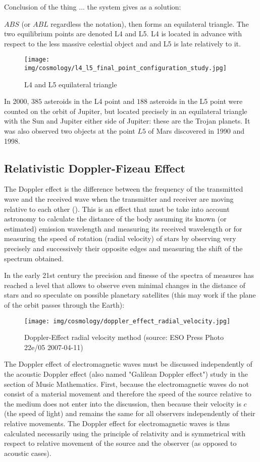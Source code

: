 	Conclusion of the thing ... the system gives as a solution:
	
	$ABS$ (or $ABL$ regardless the notation), then forms an equilateral triangle. The two equilibrium points are denoted L4 and L5. L4 is located in advance with respect to the less massive celestial object and and L5 is late relatively to it.
	\begin{figure}[H]
		\begin{center}
		\texttt{[image: img/cosmology/l4\_l5\_final\_point\_configuration\_study.jpg]}
		\end{center}	
		\caption[]{L4 and L5 equilateral triangle}
	\end{figure}
	In 2000, $385$ asteroids in the L4 point and $188$ asteroids in the L5 point were counted on the orbit of Jupiter, but located precisely in an equilateral triangle with the Sun and Jupiter either side of Jupiter: these are the Trojan planets. It was also observed two objects at the point $L5$ of Mars discovered in 1990 and 1998.
	
	\pagebreak
	\subsection{Relativistic Doppler-Fizeau Effect}
	The Doppler effect is the difference between the frequency of the transmitted wave and the received wave when the transmitter and receiver are moving relative to each other (). This is an effect that must be take into account astronomy to calculate the distance of the body assuming its known (or estimated)  emission wavelength and measuring its received wavelength or for measuring the speed of rotation (radial velocity) of stars by observing very precisely and successively their opposite edges and measuring the shift of the spectrum obtained.

	In the early 21st century the precision and finesse of the spectra of measures has reached a level that allows to observe even minimal changes in the distance of stars and so speculate on possible planetary satellites (this may work if the plane of the orbit passes through the Earth):
	\begin{figure}[H]
		\begin{center}
		\texttt{[image: img/cosmology/doppler\_effect\_radial\_velocity.jpg]}
		\end{center}	
		\caption{Doppler-Effect radial velocity method (source: ESO Press Photo 22e/05 2007-04-11)}
	\end{figure}
	The Doppler effect of electromagnetic waves must be discussed independently of the acoustic Doppler effect (also named "Galilean Doppler effect") study in the section of Music Mathematics. First, because the electromagnetic waves do not consist of a material movement and therefore the speed of the source relative to the medium does not enter into the discussion, then because their velocity is $c$ (the speed of light) and remains the same for all observers independently of their relative movements. The Doppler effect for electromagnetic waves is thus calculated necessarily using the principle of relativity and is symmetrical with respect to relative movement of the source and the observer (as opposed to acoustic cases).
	
